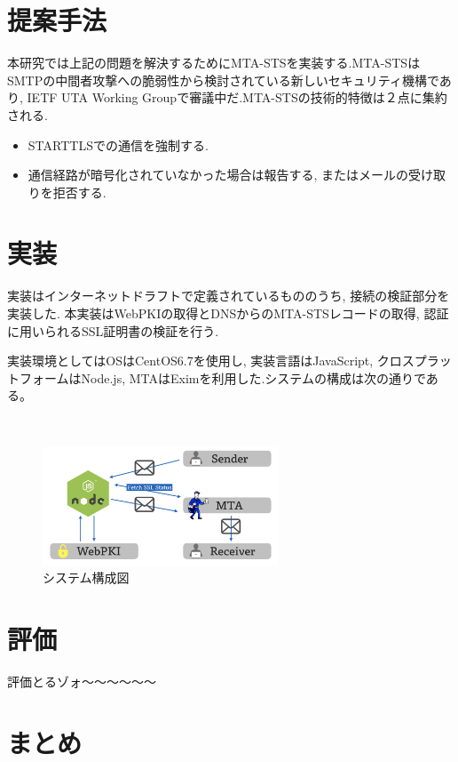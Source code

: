 \documentclass[a4j, 10pt, uplatex]{jsarticle}
\begin{document}
\section{提案手法}

本研究では上記の問題を解決するためにMTA-STSを実装する.MTA-STSはSMTPの中間者攻撃への脆弱性から検討されている新しいセキュリティ機構であり, IETF UTA Working Groupで審議中だ.\cite{draft}MTA-STSの技術的特徴は２点に集約される.

\begin{itemize}
\item STARTTLSでの通信を強制する.
\item 通信経路が暗号化されていなかった場合は報告する, またはメールの受け取りを拒否する.
\end{itemize}

\section{実装}

実装はインターネットドラフトで定義されているもののうち, 接続の検証部分を実装した. 本実装はWebPKIの取得とDNSからのMTA-STSレコードの取得, 認証に用いられるSSL証明書の検証を行う.

実装環境としてはOSはCentOS6.7を使用し, 実装言語はJavaScript, クロスプラットフォームはNode.js, MTAはEximを利用した.システムの構成は次の通りである。

\begin{figure}[htbp]
　\begin{center}
      \includegraphics[width=7cm]{system.png}
      \caption{システム構成図}
    \end{center}
\end{figure}

\section{評価}

評価とるゾォ〜〜〜〜〜〜

\section{まとめ}
\end{document}
